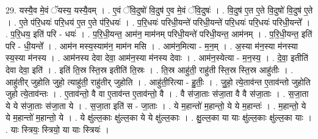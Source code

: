 \documentclass[17pt]{extarticle}
\begin{document}
29. यस्यै॒व मे॒वं ॅयस्य॒ यस्यै॒वम् । . ए॒वं ॅवि॒दुषो॑ वि॒दुष॑ ए॒व मे॒वं ॅवि॒दुषः॑ । . वि॒दुष॑ ए॒त ए॒ते वि॒दुषो॑ वि॒दुष॑ ए॒ते । . ए॒ते प॑रि॒धयः॑ परि॒धय॑ ए॒त ए॒ते प॑रि॒धयः॑ । . प॒रि॒धयः॑ परिधी॒यन्ते॑ परिधी॒यन्ते॑ परि॒धयः॑ परि॒धयः॑ परिधी॒यन्ते᳚ । . प॒रि॒धय॒ इति॑ परि - धयः॑ । . प॒रि॒धी॒यन्त॒ आम॑न॒ माम॑नम् परिधी॒यन्ते॑ परिधी॒यन्त॒ आम॑नम् । . प॒रि॒धी॒यन्त॒ इति॑ परि - धी॒यन्ते᳚ । . आम॑न मस्य॒स्याम॑न॒ माम॑न मसि । . आम॑न॒मित्या - म॒न॒म् । . अ॒स्या म॑न॒स्या म॑नस्या स्य॒स्या म॑नस्य । . आम॑नस्य देवा देवा॒ आम॑न॒स्या म॑नस्य देवाः । . आम॑न॒स्येत्या - म॒न॒स्य॒ । . दे॒वा॒ इतीति॑ देवा देवा॒ इति॑ । . इति॑ ति॒स्र स्ति॒स्र इतीति॑ ति॒स्रः । . ति॒स्र आहु॑ती॒ राहु॑ती स्ति॒स्र स्ति॒स्र आहु॑तीः । . आहु॑तीर् जुहोति जुहो॒ त्याहु॑ती॒ राहु॑तीर् जुहोति । . आहु॑ती॒रित्या - हु॒तीः॒ । . जु॒हो॒ त्ये॒ताव॑न्त ए॒ताव॑न्तो जुहोति जुहो त्ये॒ताव॑न्तः । . ए॒ताव॑न्तो॒ वै वा ए॒ताव॑न्त ए॒ताव॑न्तो॒ वै । . वै स॑जा॒ताः स॑जा॒ता वै वै स॑जा॒ताः । . स॒जा॒ता ये ये स॑जा॒ताः स॑जा॒ता ये । . स॒जा॒ता इति॑ स - जा॒ताः । . ये म॒हान्तो॑ म॒हान्तो॒ ये ये म॒हान्तः॑ । . म॒हान्तो॒ ये ये म॒हान्तो॑ म॒हान्तो॒ ये । . ये क्षु॑ल्ल॒काः क्षु॑ल्ल॒का ये ये क्षु॑ल्ल॒काः । . क्षु॒ल्ल॒का या याः क्षु॑ल्ल॒काः क्षु॑ल्ल॒का याः । . याः स्त्रियः॒ स्त्रियो॒ या याः स्त्रियः॑ । \newline
\end{document}
